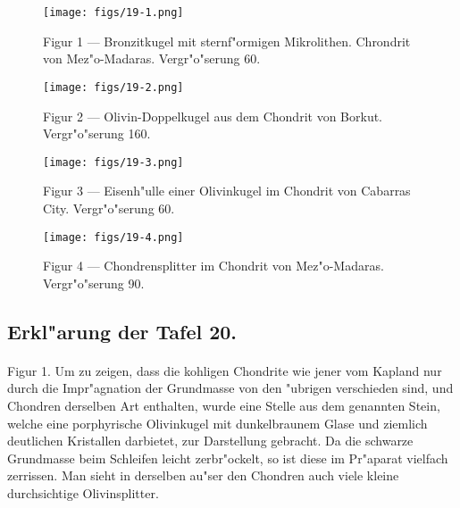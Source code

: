 \documentclass[a4paper, 11pt, oneside, polutonikogreek, german]{article}
\begin{document}
\vspace*{\fill}
\begin{figure}[H]
\centering
\texttt{[image: figs/19-1.png]}
\caption{\small Figur 1 --- Bronzitkugel mit sternf"ormigen Mikrolithen. Chrondrit von Mez"o-Madaras. Vergr"o"serung 60.}
\end{figure}
\vspace*{\fill}
\clearpage

\vspace*{\fill}
\begin{figure}[H]
\centering
\texttt{[image: figs/19-2.png]}
\caption{\small Figur 2 --- Olivin-Doppelkugel aus dem Chondrit von Borkut. Vergr"o"serung 160.}
\end{figure}
\vspace*{\fill}
\clearpage

\vspace*{\fill}
\begin{figure}[H]
\centering
\texttt{[image: figs/19-3.png]}
\caption{\small Figur 3 --- Eisenh"ulle einer Olivinkugel im Chondrit von Cabarras City. Vergr"o"serung 60.}
\end{figure}
\vspace*{\fill}
\clearpage

\vspace*{\fill}
\begin{figure}[H]
\centering
\texttt{[image: figs/19-4.png]}
\caption{\small Figur 4 --- Chondrensplitter im Chondrit von Mez"o-Madaras. Vergr"o"serung 90.}
\end{figure}
\vspace*{\fill}
\clearpage

\subsection{Erkl"arung der Tafel 20.}
\paragraph{}
Figur 1. Um zu zeigen, dass die kohligen Chondrite wie jener vom Kapland nur durch die Impr"agnation der Grundmasse von den "ubrigen verschieden sind, und Chondren derselben Art enthalten, wurde eine Stelle aus dem genannten Stein, welche eine porphyrische Olivinkugel mit dunkelbraunem Glase und ziemlich deutlichen Kristallen darbietet, zur Darstellung gebracht. Da die schwarze Grundmasse beim Schleifen leicht zerbr"ockelt, so ist diese im Pr"aparat vielfach zerrissen. Man sieht in derselben au"ser den Chondren auch viele kleine durchsichtige Olivinsplitter.
\end{document}
